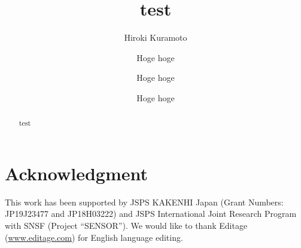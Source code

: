 \documentclass[sigconf,review]{acmart}
\begin{document}
\newcommand{\RQone}{Which \ILAful{} is the best to detect defect-fixing commits?}
\newcommand{\RQtwo}{Which \ILAful{} is the best to prevent a defect prediction model from being affected by missing defect-fixing commits in defect prediction?}
\newcommand{\RQONE}{Which \ILAFULFUL{} is the Best to Detect Defect-Fixing Commits?}
\newcommand{\RQTWO}{Which \ILAFULFUL{} is the Best to Prevent a Defect Prediction Model From Being Affected by Missing Defect-Fixing Commits in Defect Prediction?}



\title{test}

\author{Hiroki Kuramoto}
\author{Hoge hoge}
\author{Hoge hoge}
\author{Hoge hoge}

\begin{abstract}
    test
\end{abstract}


\maketitle

% 


\section*{Acknowledgment}
This work has been supported by JSPS KAKENHI Japan
(Grant Numbers: JP19J23477 and JP18H03222) and
JSPS International Joint Research Program with SNSF
(Project ``SENSOR'').
We would like to thank Editage (\url{www.editage.com})
for English language editing.


% 
% 
\end{document}
